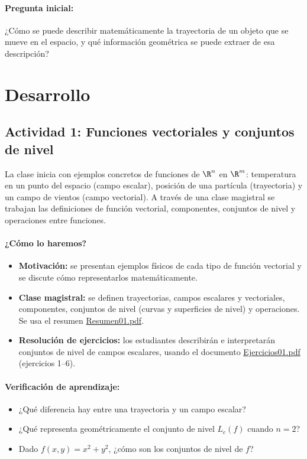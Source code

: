 \documentclass[a4,11pt]{aleph-notas}
\begin{document}
\paragraph{Pregunta inicial:}
¿Cómo se puede describir matemáticamente la trayectoria de un objeto que se mueve en el espacio, y qué información geométrica se puede extraer de esa descripción?

\section*{Desarrollo}

\subsection*{Actividad 1: Funciones vectoriales y conjuntos de nivel}
La clase inicia con ejemplos concretos de funciones de $\R^n$ en $\R^m$: temperatura en un punto del espacio (campo escalar), posición de una partícula (trayectoria) y un campo de vientos (campo vectorial). A través de una clase magistral se trabajan las definiciones de función vectorial, componentes, conjuntos de nivel y operaciones entre funciones.

\paragraph{¿Cómo lo haremos?}
\begin{itemize}[leftmargin=*]
    \item \textbf{Motivación:} se presentan ejemplos físicos de cada tipo de función vectorial y se discute cómo representarlos matemáticamente.
    \item \textbf{Clase magistral:} se definen trayectorias, campos escalares y vectoriales, componentes, conjuntos de nivel (curvas y superficies de nivel) y operaciones. Se usa el resumen \href{https://andres-merino.github.io/MatematicaIII-05-N0051/01Resumen/Resumen01.pdf}{Resumen01.pdf}.
    \item \textbf{Resolución de ejercicios:} los estudiantes describirán e interpretarán conjuntos de nivel de campos escalares, usando el documento \href{https://andres-merino.github.io/MatematicaIII-05-N0051/04Ejercicios/Ejercicios01.pdf}{Ejercicios01.pdf} (ejercicios 1--6).
\end{itemize}

\paragraph{Verificación de aprendizaje:}
\begin{itemize}[leftmargin=*]
    \item ¿Qué diferencia hay entre una trayectoria y un campo escalar?
    \item ¿Qué representa geométricamente el conjunto de nivel $L_c(f)$ cuando $n=2$?
    \item Dado $f(x,y)=x^2+y^2$, ¿cómo son los conjuntos de nivel de $f$?
\end{itemize}
\end{document}
